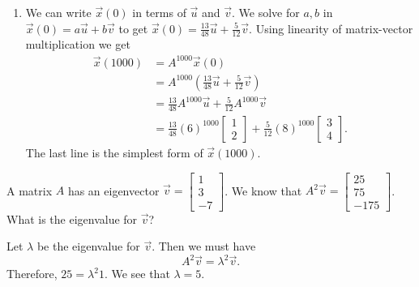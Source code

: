 \documentclass[../main.tex]{subfiles}
\begin{document}
\begin{exercise}
\begin{solution}
\begin{enumerate}
      \item We can write \(\vec{x}(0)\) in terms of \(\vec{u}\) and \(\vec{v}\). We solve for \(a,b\) in \(\vec{x}(0) = a \vec{u} + b\vec{v}\) to get \(\vec{x}(0) = \frac{13}{48} \vec{u} + \frac{5}{12} \vec{v}\). Using linearity of matrix-vector multiplication we get
        \begin{align*}
          \vec{x}(1000) 
          &= A^{1000} \vec{x}(0) \\
          &= A^{1000} \left( \frac{13}{48} \vec{u} + \frac{5}{12} \vec{v}\right) \\
          &= \frac{13}{48} A^{1000} \vec{u} + \frac{5}{12} A^{1000} \vec{v} \\
          &= \frac{13}{48} \left( 6 \right)^{1000} \begin{bmatrix} 1 \\ 2 \end{bmatrix} + \frac{5}{12} \left( 8 \right)^{1000} \begin{bmatrix} 3 \\ 4 \end{bmatrix}.
        \end{align*}
        The last line is the simplest form of \(\vec{x}(1000)\).

    \end{enumerate}
  \end{solution}
\end{exercise}

\begin{exercise}
  A matrix \(A\) has an eigenvector \(\vec{v} = \begin{bmatrix}1 \\ 3 \\ -7\end{bmatrix}\). We know that \(A^{2} \vec{v} = \begin{bmatrix} 25 \\ 75 \\ -175\end{bmatrix}\). What is the eigenvalue for \(\vec{v}\)?

  \begin{solution}
    Let \(\lambda\) be the eigenvalue for \(\vec{v}\). Then we must have
    \[
      A^{2} \vec{v} = \lambda^{2} \vec{v}. 
    \]
    Therefore, \(25 = \lambda^{2} 1\). We see that \(\lambda = 5\).
  \end{solution}
\end{exercise}
\end{document}

